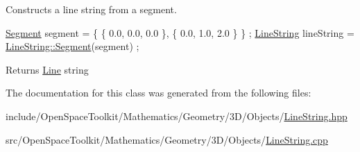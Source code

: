 Constructs a line string from a segment. 


\begin{DoxyCode}
\hyperlink{classostk_1_1math_1_1geom_1_1d3_1_1objects_1_1_line_string_a6ebca53757f7c0f7956861245e8efaf8}{Segment} segment = \{ \{ 0.0, 0.0, 0.0 \}, \{ 0.0, 1.0, 2.0 \} \} ;
\hyperlink{classostk_1_1math_1_1geom_1_1d3_1_1objects_1_1_line_string_a711ebaa7353366ba729bf1ed648fd5a4}{LineString} lineString = \hyperlink{classostk_1_1math_1_1geom_1_1d3_1_1objects_1_1_line_string_a6ebca53757f7c0f7956861245e8efaf8}{LineString::Segment}(segment) ;
\end{DoxyCode}


\begin{DoxyReturn}{Returns}
\hyperlink{classostk_1_1math_1_1geom_1_1d3_1_1objects_1_1_line}{Line} string 
\end{DoxyReturn}


The documentation for this class was generated from the following files\+:\begin{DoxyCompactItemize}
\item 
include/\+Open\+Space\+Toolkit/\+Mathematics/\+Geometry/3\+D/\+Objects/\hyperlink{3_d_2_objects_2_line_string_8hpp}{Line\+String.\+hpp}\item 
src/\+Open\+Space\+Toolkit/\+Mathematics/\+Geometry/3\+D/\+Objects/\hyperlink{3_d_2_objects_2_line_string_8cpp}{Line\+String.\+cpp}\end{DoxyCompactItemize}

